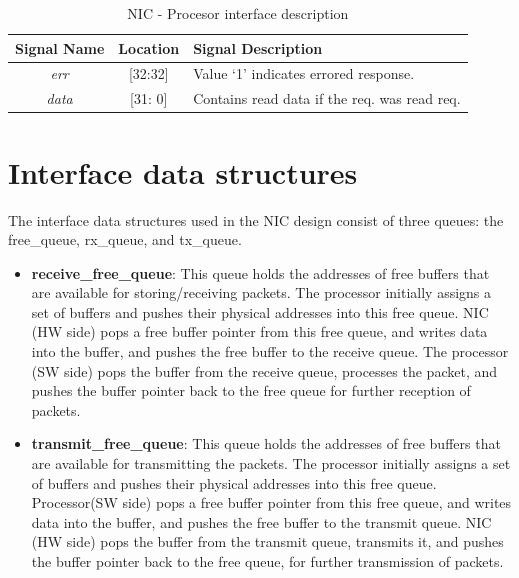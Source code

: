 \documentclass[12pt]{report}
\begin{document}
\begin{appendices}
				\begin{table}[!htbp]
					\centering
					\begin{tabular}{ccl}
						\hline
						\textbf{Signal Name} 		& \textbf{Location} 		&\textbf{Signal Description}  \\ \hline
						\textit{err}			& [32:32]			& Value `1' indicates errored response.\\\hline
						\textit{data}   		& [31: 0] 			& Contains read data if the req. was read req.\\ \hline
					\end{tabular}
					\caption{ NIC - Procesor interface description}
					\label{tab:NIC-Proc-interface-resp1}
				\end{table}

	
	\section{Interface data structures}

		The interface data structures used in the NIC design consist of three queues: the free\_queue, rx\_queue, and tx\_queue.




	\begin{itemize}

 
		\item \textbf{receive\_free\_queue}: This queue holds the addresses of free buffers that are available for storing/receiving packets. The processor initially assigns a set of buffers and pushes their physical addresses into this free queue. NIC (HW side) pops a free buffer pointer from this free queue, and
	writes data into the buffer, and pushes the free 
        buffer to the receive queue. The processor (SW side) pops the buffer from the receive queue, processes the packet, and pushes the buffer pointer back to the free queue for further reception of packets.\\

        \item \textbf{transmit\_free\_queue}: This queue holds the addresses of free buffers that are available for transmitting the packets. The processor initially assigns a set of buffers and pushes their physical addresses into this free queue. Processor(SW side) pops a free buffer pointer from this free queue, and
	writes data into the buffer, and pushes the free 
        buffer to the transmit queue.
	NIC (HW side) pops the buffer from the transmit queue, transmits it, and pushes the buffer pointer back to the free queue, for further transmission of packets. \\


\end{itemize}
\end{appendices}
\end{document}
